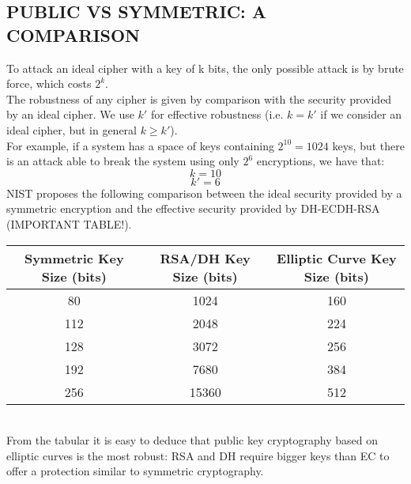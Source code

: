 \documentclass[a4paper, 10pt, titlepage]{article}
\begin{document}
\subsection{PUBLIC VS SYMMETRIC: A COMPARISON}
To attack an ideal cipher with a key of k bits, the only possible attack is by brute force, which costs $2^k$. \\
The robustness of any cipher is given by comparison with the security provided by an ideal cipher. We use $k'$ for effective robustness (i.e. $k = k'$ if we consider an ideal cipher, but in general $k \geq k'$). \\
For example, if a system has a space of keys containing $2^{10} = 1024$ keys, but there is an attack able to break the system using only $2^6$ encryptions, we have that:
$$k = 10$$
$$k' =6$$
NIST proposes the following comparison between the ideal security provided by a symmetric encryption and the effective security provided by DH-ECDH-RSA (IMPORTANT TABLE!).\medskip \\
\begin{tabular}{|c|c|c|}\hline
Symmetric Key Size (bits) & RSA/DH Key Size (bits) & Elliptic Curve Key Size (bits) \\ \hline
80 & 1024 & 160 \\ 
112 & 2048 & 224 \\
128 & 3072 & 256 \\
192 & 7680 & 384 \\
256 & 15360 & 512 \\ \hline
\end{tabular} \medskip \\
From the tabular it is easy to deduce that public key cryptography based on elliptic curves is the most robust: RSA and DH require bigger keys than EC to offer a protection similar to symmetric cryptography.

\newpage
\end{document}
